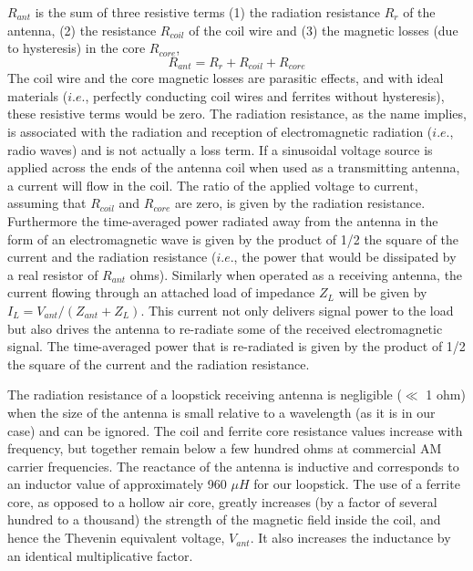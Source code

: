 \documentclass [utf8] {article}
\begin{document}
{	$R_{ant}$ is the sum of three resistive terms (1) the radiation resistance $R_r$ of the antenna, (2) the resistance $R_{coil}$ of the coil wire and (3) the magnetic losses (due to hysteresis) in the core $R_{core}$,
	$$R_{ant} = R_r + R_{coil} + R_{core}$$
	The coil wire and the core magnetic losses are parasitic effects, and with ideal materials ($i.e.$, perfectly conducting coil wires and ferrites without hysteresis), these resistive terms would be zero. The radiation resistance, as the name implies, is associated with the radiation and reception of electromagnetic radiation ($i.e.$, radio waves) and is not actually a loss term. If a sinusoidal voltage source is applied across the ends of the antenna coil when used as a transmitting antenna, a current will flow in the coil. The ratio of the applied voltage to current, assuming that $R_{coil}$ and $R_{core}$ are zero, is given by the radiation resistance. Furthermore the time-averaged power radiated away from the antenna in the form of an electromagnetic wave is given by the product of 1/2 the square of the current and the radiation resistance ($i.e.$, the power that would be dissipated by a real resistor of $R_{ant}$ ohms). Similarly when operated as a receiving antenna, the current flowing through an attached load of impedance $Z_L$ will be given by $I_L = V_{ant}/(Z_{ant} +Z_L )$. This current not only delivers signal power to the load but also drives the antenna to re-radiate some of the received electromagnetic signal. The time-averaged power that is re-radiated is given by the product of 1/2 the square of the current and the radiation resistance.

	The radiation resistance of a loopstick receiving antenna is negligible ($\ll$ 1 ohm) when the size of the antenna is small relative to a wavelength (as it is in our case) and can be ignored. The coil and ferrite core resistance values increase with frequency, but together remain below a few hundred ohms at commercial AM carrier frequencies. The reactance of the antenna is inductive and corresponds to an inductor value of approximately 960 $\mu H$ for our loopstick. The use of a ferrite core, as opposed to a hollow air core, greatly increases (by a factor of several hundred to a thousand) the strength of the magnetic field inside the coil, and hence the Thevenin equivalent voltage, $V_{ant}$. It also increases the inductance by an identical multiplicative factor.

}
\end{document}
